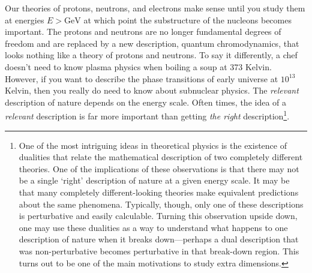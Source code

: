 \begin{example}
Our theories of protons, neutrons, and electrons make sense until you study them at energies $E>\text{GeV}$ at which point the substructure of the nucleons becomes important. The protons and neutrons are no longer fundamental degrees of freedom and are replaced by a new description, quantum chromodynamics, that looks nothing like a theory of protons and neutrons. To say it differently, a chef doesn't need to know plasma physics when boiling a soup at 373 Kelvin. However, if you want to describe the phase transitions of early universe at $10^{13}$ Kelvin, then you really do need to know about subnuclear physics. The \emph{relevant} description of nature depends on the energy scale. Often times, the idea of a \emph{relevant} description is far more important than getting \emph{the right} description\footnote{One of the most intriguing ideas in theoretical physics is the existence of dualities that relate the mathematical description of two completely different theories. One of the implications of these observations is that there may not be a single `right' description of nature at a given energy scale. It may be that many completely different-looking theories make equivalent predictions about the same phenomena. Typically, though, only one of these descriptions is perturbative and easily calculable. Turning this observation upside down, one may use these dualities as a way to understand what happens to one description of nature when it breaks down---perhaps a dual description that was non-perturbative becomes perturbative in that break-down region. This turns out to be one of the main motivations to study extra dimensions.}.
\end{example}

